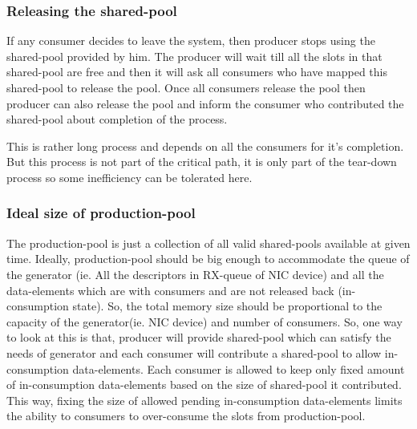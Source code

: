 \documentclass[a4paper,twoside]{report} %
\begin{document}
\subsubsection{Releasing the shared-pool}
If any consumer decides to leave the system, then producer
stops using the shared-pool provided by him.  The producer will 
wait till all the slots in that shared-pool are free and then it will
ask all consumers who have mapped this shared-pool to release the
pool.  Once all consumers release the pool then producer can also
release the pool and inform the consumer who contributed the
shared-pool about completion of the process.

This is rather long process and depends on all the consumers for it's
completion.  But this process is not part of the critical path, it is 
only part of the tear-down process so some inefficiency can be 
tolerated here.




\subsubsection{Ideal size of production-pool}
The production-pool is just a collection of all valid shared-pools
available at given time.  Ideally, production-pool should be big enough 
to accommodate the queue of the generator (ie. All the descriptors 
in RX-queue of NIC device) and all the data-elements which are with 
consumers and are not released back (in-consumption state).  
So, the total memory size should be proportional to the capacity of 
the generator(ie. NIC device) and number of consumers.  
So, one way to look at this is that, producer will provide shared-pool
which can satisfy the needs of generator and each consumer will
contribute a shared-pool to allow in-consumption data-elements.
Each consumer is allowed to keep only fixed amount of 
in-consumption data-elements based on the size of shared-pool it
contributed. This way, fixing the size of allowed pending
in-consumption data-elements limits the ability to consumers to
over-consume the slots from production-pool.
\end{document}
